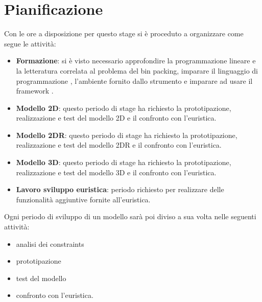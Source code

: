 \section{Pianificazione}
Con le ore a disposizione per questo stage si è proceduto a organizzare come segue le attività:
\begin{itemize}
	\item \textbf{Formazione}: si è visto necessario approfondire la programmazione lineare e la letteratura correlata al problema del bin packing, imparare il linguaggio di programmazione , l'ambiente fornito dallo strumento  e imparare ad usare il framework .
	\item \textbf{Modello 2D}: questo periodo di stage ha richiesto la prototipazione, realizzazione e test del modello 2D e il confronto con l'euristica.
	\item \textbf{Modello 2DR}: questo periodo di stage ha richiesto la prototipazione, realizzazione e test del modello 2DR e il confronto con l'euristica.
	\item \textbf{Modello 3D}: questo periodo di stage ha richiesto la prototipazione, realizzazione e test del modello 3D e il confronto con l'euristica.
	\item \textbf{Lavoro sviluppo euristica}: periodo richiesto per realizzare delle funzionalità aggiuntive fornite all'euristica.
\end{itemize}

Ogni periodo di sviluppo di un modello sarà poi diviso a sua volta nelle seguenti attività:
\begin{itemize}
	\item analisi dei constraints
	\item prototipazione 
	\item test del modello
	\item confronto con l'euristica.
\end{itemize}

